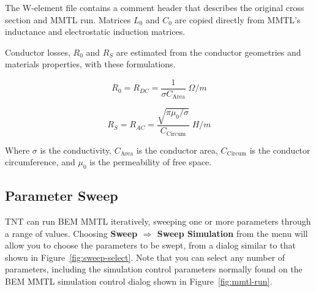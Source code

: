 \documentclass{article}
\begin{document}
The W-element file contains a comment header that describes the
original cross section and MMTL run.  Matrices $L_0$ and $C_0$ are
copied directly from MMTL's inductance and electrostatic induction
matrices.

Conductor losses, $R_0$ and $R_S$ are estimated from the conductor
geometries and materials properties, with these formulations.

\begin{equation}
R_0 = R_{DC} = \frac {1} {\sigma C_\text{Area}} \; \Omega/m
\end{equation}

\begin{equation}
R_S = R_{AC} = \frac {\sqrt{ \pi \mu_0 / \sigma}} {C_\text{Circum}} \; H/m
\end{equation}

Where $\sigma$ is the conductivity, $C_\text{Area}$ is the conductor
area, $C_\text{Circum}$ is the conductor circumference, and $\mu_0$ is
the permeability of free space.



\subsection {Parameter Sweep}

TNT can run BEM MMTL iteratively, sweeping one or more parameters
through a range of values.  Choosing {\bf Sweep $\Rightarrow$ Sweep
Simulation} from the menu will allow you to choose the parameters to
be swept, from a dialog similar to that shown in
Figure~\ref{fig:sweep-select}.  Note that you can select any number of
parameters, including the simulation control parameters normally found
on the BEM MMTL simulation control dialog shown in
Figure~\ref{fig:mmtl-run}.
\end{document}
